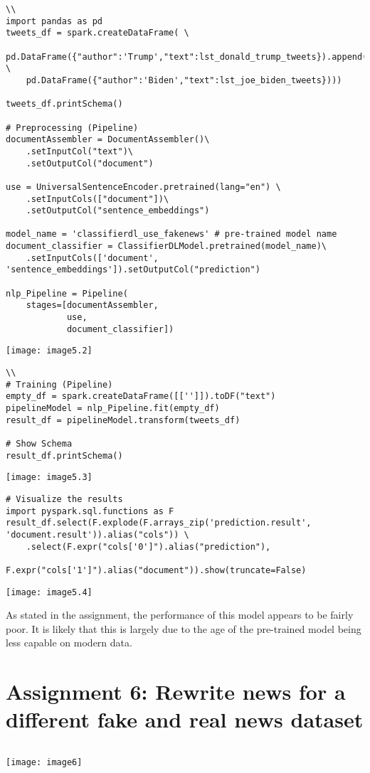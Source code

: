 \documentclass[]{article}
\begin{document}
\begin{verbatim}\\
import pandas as pd
tweets_df = spark.createDataFrame( \
	pd.DataFrame({"author":'Trump',"text":lst_donald_trump_tweets}).append( \
	pd.DataFrame({"author":'Biden',"text":lst_joe_biden_tweets})))

tweets_df.printSchema()

# Preprocessing (Pipeline)
documentAssembler = DocumentAssembler()\
	.setInputCol("text")\
	.setOutputCol("document")

use = UniversalSentenceEncoder.pretrained(lang="en") \
	.setInputCols(["document"])\
	.setOutputCol("sentence_embeddings")

model_name = 'classifierdl_use_fakenews' # pre-trained model name
document_classifier = ClassifierDLModel.pretrained(model_name)\
	.setInputCols(['document', 
'sentence_embeddings']).setOutputCol("prediction")

nlp_Pipeline = Pipeline(
	stages=[documentAssembler, 
			use,
			document_classifier])
\end{verbatim}
\texttt{[image: image5.2]} %

\begin{verbatim}\\
# Training (Pipeline)
empty_df = spark.createDataFrame([['']]).toDF("text")
pipelineModel = nlp_Pipeline.fit(empty_df)
result_df = pipelineModel.transform(tweets_df)

# Show Schema
result_df.printSchema()
\end{verbatim}
\texttt{[image: image5.3]} %


\begin{verbatim}
# Visualize the results
import pyspark.sql.functions as F
result_df.select(F.explode(F.arrays_zip('prediction.result', 
'document.result')).alias("cols")) \
	.select(F.expr("cols['0']").alias("prediction"),
			F.expr("cols['1']").alias("document")).show(truncate=False)
\end{verbatim}
\texttt{[image: image5.4]} %

As stated in the assignment, the performance of this model appears to be fairly poor. It is likely that this is largely due to the age of the pre-trained model being less capable on modern data.


\section*{Assignment 6: Rewrite news for a different fake and real news dataset}
\begin{verbatim}
\end{verbatim}
\texttt{[image: image6]} 
\end{document}
